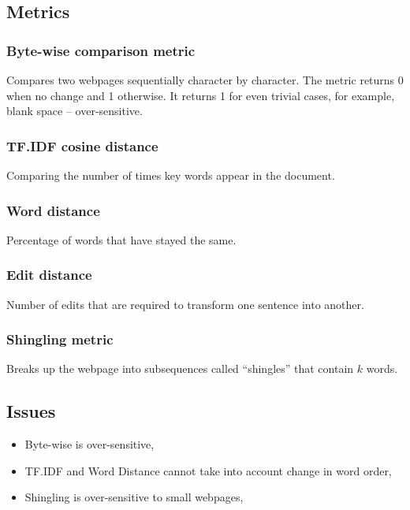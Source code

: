 \documentclass[10pt, a4paper]{article}
\begin{document}
\subsection{Metrics}
\subsubsection*{Byte-wise comparison metric}
Compares two webpages sequentially character by character. The metric returns 0 when no change and 1 otherwise. It returns 1 for even trivial cases, for example, blank space -- over-sensitive.

\subsubsection*{TF.IDF cosine distance}
Comparing the number of times key words appear in the document.

\subsubsection*{Word distance}
Percentage of words that have stayed the same.

\subsubsection*{Edit distance}
Number of edits that are required to transform one sentence into another.

\subsubsection*{Shingling metric}
Breaks up the webpage into subsequences called ``shingles'' that contain $k$ words.

\subsection{Issues}
\begin{itemize}
	\item Byte-wise is over-sensitive,
	\item TF.IDF and Word Distance cannot take into account change in word order,
	\item Shingling is over-sensitive to small webpages,
	
\end{itemize}
\end{document}
